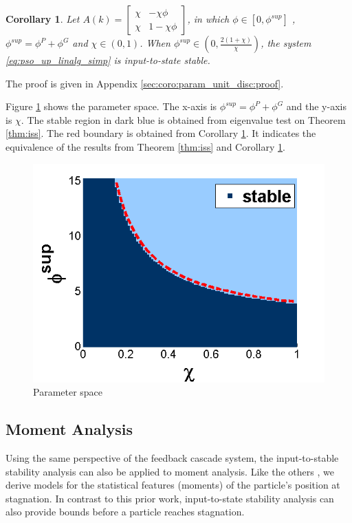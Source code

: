 \documentclass{sig-alternate}
\newtheorem{mycoro}{Corollary}
\begin{document}
\begin{mycoro}
\label{coro:param_unit_disc}
Let $ A(k) = 
\begin{bmatrix}
\chi & - \chi \phi \\
\chi & 1 - \chi \phi
\end{bmatrix}
$, in which
$ \phi \in [0, \phi^{sup}] $ , $ \phi^{sup} = \phi^{P} + \phi^{G} $ and $ \chi \in ( 0, 1 ) $.
When $ \phi^{sup} \in \left( 0 , \frac{2(1+\chi)}{\chi} \right) $, the system \eqref{eq:pso_up_linalg_simp} is input-to-state stable.
\end{mycoro}
The proof is given in Appendix \ref{sec:coro:param_unit_disc:proof}.

Figure \ref{fig:paramSpace} shows the parameter space.
The x-axis is $ \phi^{sup} = \phi^{P} + \phi^{G} $ and the y-axis is $ \chi $.
The stable region in dark blue is obtained from eigenvalue test on Theorem \ref{thm:iss}.
The red boundary is obtained from Corollary \ref{coro:param_unit_disc}.
It indicates the equivalence of  the results from Theorem \ref{thm:iss} and Corollary \ref{coro:param_unit_disc}.

\begin{figure}
\centering
\includegraphics[width=0.8\linewidth]{./param2.png}
\caption{Parameter space}
\label{fig:paramSpace}
\end{figure}


\subsection{Moment Analysis}
\label{sec:moment_analysis}

Using the same perspective of the feedback cascade system, the input-to-stable stability analysis can also be applied to moment analysis.
Like the others \cite{Jiang20078,Poli:2008:DSS:1384929.1384944}, we derive models for the statistical features (moments) of the particle's position at stagnation.
In contrast to this prior work,
input-to-state stability analysis can also provide bounds before a particle reaches stagnation.
\end{document}
